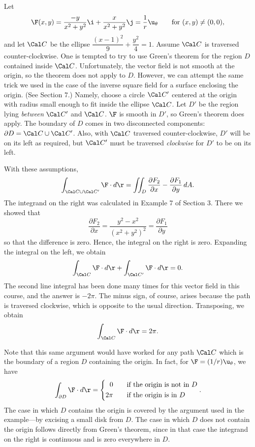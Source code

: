 \nextex
{}
  Let
$$
\F(x,y) = \frac{-y}{x^2 + y^2}\i + \frac x{x^2 + y^2}\j =
         \frac 1r \u_\theta\qquad\text{for } (x,y)\not= (0,0),
$$
and let $\Cal C$ be the ellipse  $\dfrac{(x - 1)^2}9 +
\dfrac{y^2}4 = 1$.  Assume $\Cal C$ is traversed counter-clockwise.
One is tempted to try to use Green's theorem for the
region $D$ contained inside $\Cal C$.  Unfortunately,
the vector field is not smooth at the origin, so the theorem
does not apply to $D$.  However, we can attempt the same trick we
used in the case of the inverse square field for a surface
enclosing the origin.   (See Section 7.)
Namely, choose a circle $\Cal C'$ centered at the origin
 with radius small enough to fit inside the ellipse $\Cal C$.
Let $D'$ be the region lying {\it between\/} $\Cal C'$ and 
$\Cal C$.  $\F$ is smooth in $D'$, so Green's theorem
does apply.  The boundary of $D$ comes in two
disconnected components:  $\partial D = \Cal C\cup\Cal C'$.
Also, with $\Cal C$ traversed counter-clockwise, 
$D'$ will be on its left as required, but $\Cal C'$ must be traversed
{\it clockwise\/} for $D'$ to be on its left.
\medskip
\centerline{}
\medskip
With these assumptions,
$$
\int_{\Cal C\cup\Cal C'} \F\cdot d\r = \iint_D
\frac{\partial F_2}{\partial x} - \frac{\partial F_1}{\partial y}\,dA.
$$
The integrand on the right was calculated in Example 7
of Section 3.
There we showed that
$$
\frac{\partial F_2}{\partial x} = \frac{y^2 - x^2}{(x^2 + y^2)^2}
= \frac{\partial F_1}{\partial y}
$$
so that the difference is zero.
Hence, the integral on the right is zero.
Expanding the integral on the left, we obtain
$$
\int_{\Cal C} \F\cdot d\r +
 \int_{\Cal C'} \F\cdot d\r = 0.
$$
The second line integral has been done many times for this
vector field in this
course, and the answer is $-2\pi$.  The minus sign, of course,
arises because the path is traversed clockwise, which is
opposite to the usual direction.  Transposing, we obtain
$$
\int_{\Cal C} \F\cdot d\r = 2\pi.
$$
\endexample

  Note that this same argument would have worked for any
path $\Cal C$ which is the boundary of a region $D$ containing
the origin.  In fact, for $\F = (1/r)\u_\theta$, we have
$$
\int_{\partial D} \F\cdot d\r = \left\{
\aligned 0\qquad&\text{if the origin is not in } D\\
         2\pi\qquad&\text{if the origin is in } D
\endaligned \right . .
$$
The case in which $D$ contains the origin is covered by the
argument used in the example---by excising a small disk from $D$.
The case in which $D$ does not contain the origin follows directly
from Green's theorem, since in that case the integrand on the
right is continuous and is zero everywhere in $D$.

